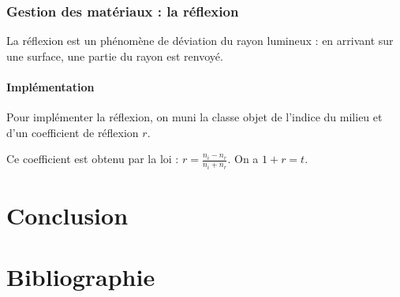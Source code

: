 \documentclass{article}
\begin{document}
\subsubsection{Gestion des matériaux : la réflexion}
La réflexion est un phénomène de déviation du rayon lumineux : en arrivant
sur une surface, une partie du rayon est renvoyé.

\paragraph{Implémentation}
Pour implémenter la réflexion, on muni la classe objet de l'indice du milieu et
d'un coefficient de réflexion $r$.

Ce coefficient est obtenu par la loi : $r= \frac{n_i - n_r}{n_i + n_r}$. On a 
$1+r=t$.

\section{Conclusion}

\appendix
\section{Bibliographie}
\end{document}
